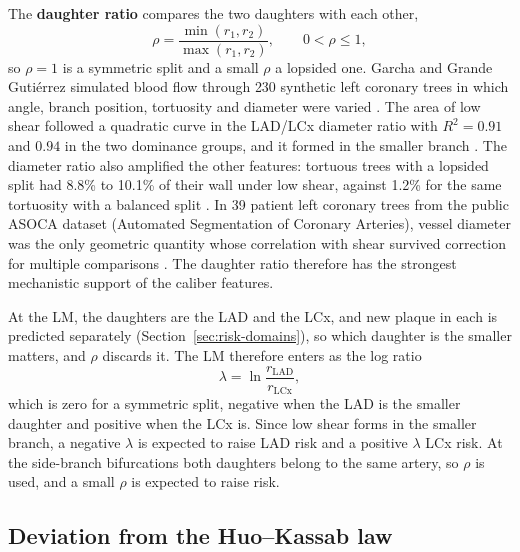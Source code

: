 The \textbf{daughter ratio} compares the two daughters with each other,
\begin{equation}
  \rho = \frac{\min(r_1, r_2)}{\max(r_1, r_2)}, \qquad 0 < \rho \leq 1,
  \label{eq:risk-daughter}
\end{equation}
so $\rho = 1$ is a symmetric split and a small $\rho$ a lopsided one.
Garcha and Grande Guti\'errez simulated blood flow through 230 synthetic left coronary trees in which angle, branch position, tortuosity and diameter were varied \cite{garcha2025sensitivity}.
The area of low shear followed a quadratic curve in the LAD/LCx diameter ratio with $R^2 = 0.91$ and $0.94$ in the two dominance groups, and it formed in the smaller branch \cite{garcha2025sensitivity}.
The diameter ratio also amplified the other features: tortuous trees with a lopsided split had 8.8\% to 10.1\% of their wall under low shear, against 1.2\% for the same tortuosity with a balanced split \cite{garcha2025sensitivity}.
In 39 patient left coronary trees from the public ASOCA dataset (Automated Segmentation of Coronary Arteries), vessel diameter was the only geometric quantity whose correlation with shear survived correction for multiple comparisons \cite{shen2025helical}.
The daughter ratio therefore has the strongest mechanistic support of the caliber features.

At the LM, the daughters are the LAD and the LCx, and new plaque in each is predicted separately (Section~\ref{sec:risk-domains}), so which daughter is the smaller matters, and $\rho$ discards it.
The LM therefore enters as the log ratio
\begin{equation}
  \lambda = \ln\frac{r_{\mathrm{LAD}}}{r_{\mathrm{LCx}}},
  \label{eq:risk-lambda}
\end{equation}
which is zero for a symmetric split, negative when the LAD is the smaller daughter and positive when the LCx is.
Since low shear forms in the smaller branch, a negative $\lambda$ is expected to raise LAD risk and a positive $\lambda$ LCx risk.
At the side-branch bifurcations both daughters belong to the same artery, so $\rho$ is used, and a small $\rho$ is expected to raise risk.

\subsection{Deviation from the Huo--Kassab law}


